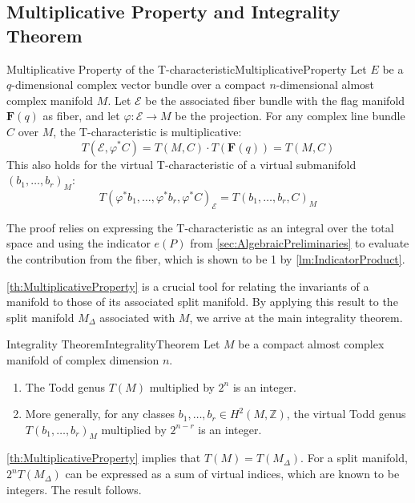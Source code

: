 \documentclass{book}
\let\temp\phi
\let\phi\varphi
\let\varphi\temp
\begin{document}
\subsection{Multiplicative Property and Integrality Theorem} \label{sec:Integrality}

\begin{thm}{Multiplicative Property of the T-characteristic}{MultiplicativeProperty}
Let $E$ be a $q$-dimensional complex vector bundle over a compact $n$-dimensional almost complex manifold $M$. Let $\mathcal{E}$ be the associated fiber bundle with the flag manifold $\mathbf{F}(q)$ as fiber, and let $\phi: \mathcal{E} \to M$ be the projection. For any complex line bundle $C$ over $M$, the T-characteristic is multiplicative:
\[
T(\mathcal{E}, \phi^* C) = T(M, C) \cdot T(\mathbf{F}(q)) = T(M, C)
\]
This also holds for the virtual T-characteristic of a virtual submanifold $(b_1, \dots, b_r)_M$:
\[
T(\phi^*b_1, \dots, \phi^*b_r, \phi^*C)_{\mathcal{E}} = T(b_1, \dots, b_r, C)_M
\]
\end{thm}
\begin{Proof}
The proof relies on expressing the T-characteristic as an integral over the total space and using the indicator $e(P)$ from \cref{sec:AlgebraicPreliminaries} to evaluate the contribution from the fiber, which is shown to be 1 by \cref{lm:IndicatorProduct}.
\end{Proof}

\cref{th:MultiplicativeProperty} is a crucial tool for relating the invariants of a manifold to those of its associated split manifold. By applying this result to the split manifold $M_\Delta$ associated with $M$, we arrive at the main integrality theorem.

\begin{thm}{Integrality Theorem}{IntegralityTheorem}
Let $M$ be a compact almost complex manifold of complex dimension $n$.
\begin{enumerate}
    \item The Todd genus $T(M)$ multiplied by $2^n$ is an integer.
    \item More generally, for any classes $b_1, \dots, b_r \in H^2(M, \mathbb{Z})$, the virtual Todd genus $T(b_1, \dots, b_r)_M$ multiplied by $2^{n-r}$ is an integer.
\end{enumerate}
\end{thm}
\begin{Proof}
\cref{th:MultiplicativeProperty} implies that $T(M) = T(M_\Delta)$. For a split manifold, $2^n T(M_\Delta)$ can be expressed as a sum of virtual indices, which are known to be integers. The result follows.
\end{Proof}
\end{document}
